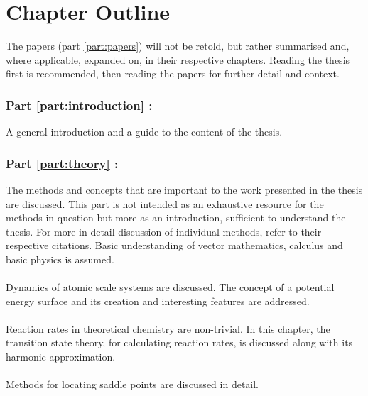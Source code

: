 \section{Chapter Outline}
\label{sec:chapters}

The papers (part \ref{part:papers}) will not be retold, but rather summarised and, where applicable, expanded on, in their respective chapters.
Reading the thesis first is recommended, then reading the papers for further detail and context.

\subsubsection{Part \ref{part:introduction} : }
A general introduction and a guide to the content of the thesis.

\subsubsection{Part \ref{part:theory} : }
The methods and concepts that are important to the work presented in the thesis are discussed.
This part is not intended as an exhaustive resource for the methods in question but more as an introduction, sufficient to understand the thesis.
For more in-detail discussion of individual methods, refer to their respective citations.
Basic understanding of vector mathematics, calculus and basic physics is assumed.

\paragraph{}
Dynamics of atomic scale systems are discussed.
The concept of a potential energy surface and its creation and interesting features are addressed.

\paragraph{}
Reaction rates in theoretical chemistry are non-trivial.
In this chapter, the transition state theory, for calculating reaction rates, is discussed along with its harmonic approximation.

\paragraph{}
Methods for locating saddle points are discussed in detail.

